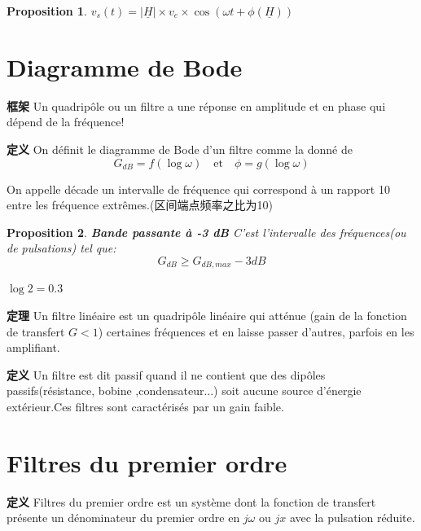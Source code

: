 \documentclass[12pt]{book}
\theoremstyle{definition}\newtheorem{dfn}{Définition}[chapter]
\theoremstyle{plain}\newtheorem{thm}{Théorème}[chapter]
\theoremstyle{plain}\newtheorem{prp}{Proposition}[chapter]
\theoremstyle{plain}\newtheorem{lem}{\bf Lemme}[chapter]
\theoremstyle{plain}\newtheorem{axm}{\bf Axiome}[chapter]
\theoremstyle{plain}\newtheorem{lmm}{\bf Lemme}[chapter]
\theoremstyle{plain}\newtheorem{cor}{\bf Corollaire}[chapter]
\theoremstyle{remark}\newtheorem{rem}{Remarque}[chapter]
\begin{document}
\begin{framed}
	\begin{prp}
	$v_s(t)=\left| \underline{H}\right|\times v_e \times \cos (\omega t + \phi(\underline{H}))$
	\end{prp}
\end{framed}


\section{Diagramme de Bode}
\begin{framed}{\textbf{框架}}
Un quadripôle ou un filtre a une réponse en amplitude et en phase qui dépend de la fréquence!
\end{framed}
\begin{framed}{\textbf{定义}}
On définit le diagramme de Bode d'un filtre comme la donné de 
$$
G_{dB}=f(\log\omega)\quad \text{et} \quad\phi=g(\log\omega)
$$

On appelle {\color{red}décade} un intervalle de fréquence qui correspond à un rapport 10 entre les fréquence extrêmes.(区间端点频率之比为10)
\end{framed}
\begin{framed}
\begin{prp}{\textbf{Bande passante à -3 dB}}
C'est l'intervalle des fréquences(ou de pulsations) tel que: 	
	$$G_{dB}\ge G_{dB,max}-3dB$$
	
$\log2=0.3$
\end{prp}
\end{framed}
\begin{framed}{\textbf{定理}}
	Un filtre linéaire est un quadripôle linéaire qui atténue (gain de la fonction de transfert $G<1$) certaines fréquences et en laisse passer d'autres, parfois en les amplifiant.   
\end{framed}
\begin{framed}{\textbf{定义}}
	Un filtre est dit passif quand il ne contient que des dipôles passifs(résistance, bobine ,condensateur...) soit aucune source d'énergie extérieur.Ces filtres sont caractérisés par un gain faible.
\end{framed}
\section{Filtres du premier ordre}
\begin{framed}{\textbf{定义}}
Filtres du premier ordre est un système dont la fonction de transfert présente {\color{red}un dénominateur du premier ordre en $j\omega$} ou $jx$ avec la pulsation réduite.
\end{framed}
\end{document}
